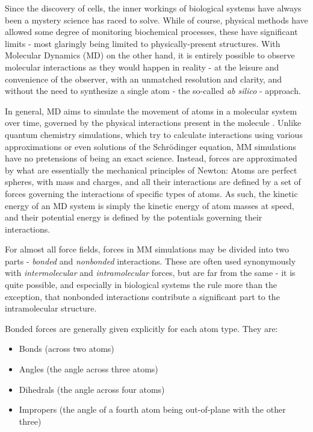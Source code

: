 \documentclass[oneside]{scrreprt}
\begin{document}
Since the discovery of cells, the inner workings of biological systems have always been a mystery science has raced to solve. While of course, physical methods have allowed some degree of monitoring biochemical processes, these have significant limits - most glaringly being limited to physically-present structures. With Molecular Dynamics (MD) on the other hand, it is entirely possible to observe molecular interactions as they would happen in reality - at the leisure and convenience of the observer, with an unmatched resolution and clarity, and without the need to synthesize a single atom - the so-called \emph{ab silico} - approach.

In general, MD aims to simulate the movement of atoms in a molecular system over time, governed by the physical interactions present in the molecule \cite{Hollingsworth2018Sep}. Unlike quantum chemistry simulations, which try to calculate interactions using various approximations or even solutions of the Schrödinger equation, MM simulations have no pretensions of being an exact science. Instead, forces are approximated by what are essentially the mechanical principles of Newton: Atoms are perfect spheres, with mass and charges, and all their interactions are defined by a set of forces governing the interactions of specific types of atoms. As such, the kinetic energy of an MD system is simply the kinetic energy of atom masses at speed, and their potential energy is defined by the potentials governing their interactions.

For almost all force fields, forces in MM simulations may be divided into two parts - \emph{bonded} and \emph{nonbonded} interactions. These are often used synonymously with \emph{intermolecular} and \emph{intramolecular} forces, but are far from the same - it is quite possible, and especially in biological systems the rule more than the exception, that nonbonded interactions contribute a significant part to the intramolecular structure.

Bonded forces are generally given explicitly for each atom type. They are:
\begin{itemize}
    \item Bonds (across two atoms)
    \item Angles (the angle across three atoms)
    \item Dihedrals (the angle across four atoms)
    \item Impropers (the angle of a fourth atom being out-of-plane with the other three)
\end{itemize}
\end{document}
